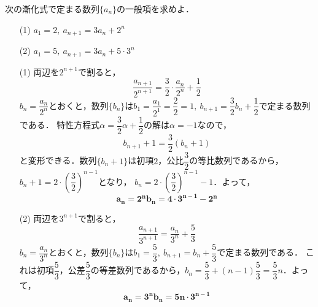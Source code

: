 \documentclass[a4paper,11pt]{ltjsarticle}
\begin{document}
 \begin{toi}
次の漸化式で定まる数列$\{a_n\}$の一般項を求めよ．\\
\begin{minipage}{0.5\linewidth}
\begin{itemize}
    \item [(1)]$a_1=2,~a_{n+1}=3a_n+2^n$
\end{itemize}
\end{minipage}
\begin{minipage}{0.5\linewidth}
\begin{itemize}
    \item [(2)]$a_1=5,~a_{n+1}=3a_n+5\cdot3^n$
\end{itemize}
\end{minipage}
\end{toi}
\ans 
\begin{itemize}
    \item [(1)]両辺を$2^{n+1}$で割ると，
 \[\frac{a_{n+1}}{2^{n+1}}=\frac32\cdot \frac{a_n}{2^n}+\frac12\]
 $b_n=\dfrac{a_n}{2^n}$とおくと，数列$\{b_n\}$は$b_1=\dfrac{a_1}{2^1}=\dfrac22=1,~b_{n+1}=\dfrac32 b_n+\dfrac12$で定まる数列である．
 特性方程式$\alpha=\dfrac32\alpha+\dfrac12$の解は$\alpha=-1$なので，
 \[b_{n+1}+1=\frac32(b_n+1)\]
 と変形できる．数列$\{b_n+1\}$は初項$2$，公比$\dfrac32$の等比数列であるから，$b_n+1=2\cdot\left(\dfrac32\right)^{n-1}$となり，
 $b_n=2\cdot\left(\dfrac32\right)^{n-1}-1$．よって，
 \[\boldsymbol{a_n=2^nb_n=4\cdot3^{n-1}-2^n}\]

\item[(2)] 両辺を$3^{n+1}$で割ると，
 \[\frac{a_{n+1}}{3^{n+1}}=\frac{a_n}{3^n}+\frac53\]
 $b_n=\dfrac{a_n}{3^n}$とおくと，数列$\{b_n\}$は$b_1=\dfrac53,~b_{n+1}=b_n+\dfrac53$で定まる数列である．
 これは初項$\dfrac53$，公差$\dfrac53$の等差数列であるから，$b_n=\dfrac53+(n-1)\dfrac53=\dfrac53n$．よって，
 \[\boldsymbol{a_n=3^nb_n=5n\cdot3^{n-1}}\]\end{itemize}
\end{document}
